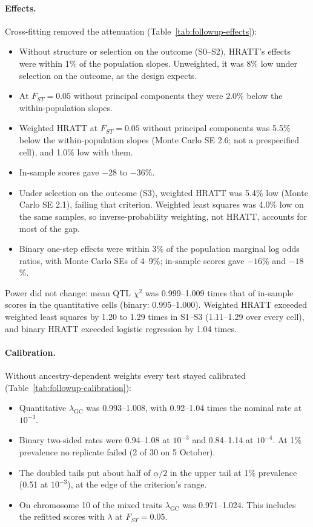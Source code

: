 \documentclass[11pt]{article}
\newcommand{\lgc}{\lambda_{\mathrm{GC}}}
\begin{document}
\paragraph{Effects.}
Cross-fitting removed the attenuation (Table~\ref{tab:followup-effects}):
\begin{itemize}
 \item Without structure or selection on the outcome (S0--S2), HRATT's
  effects were within 1\% of the population slopes. Unweighted, it was 8\%
  low under selection on the outcome, as the design expects.
 \item At $F_{ST}=0.05$ without principal components they were 2.0\% below the
  within-population slopes.
 \item Weighted HRATT at $F_{ST}=0.05$ without principal components was 5.5\%
  below the within-population slopes (Monte Carlo SE 2.6; not a prespecified
  cell), and 1.0\% low with them.
 \item In-sample scores gave $-28$ to $-36$\%.
 \item Under selection on the outcome (S3), weighted HRATT was 5.4\% low
  (Monte Carlo SE 2.1), failing that criterion. Weighted least squares was
  4.0\% low on the same samples, so inverse-probability weighting, not
  HRATT, accounts for most of the gap.
 \item Binary one-step effects were within 3\% of the population marginal log
  odds ratios, with Monte Carlo SEs of 4--9\%; in-sample scores gave
  $-16$\% and $-18$\%.
\end{itemize}

Power did not change: mean QTL $\chi^2$ was 0.999--1.009 times that of
in-sample scores in the quantitative cells (binary: 0.995--1.000). Weighted
HRATT exceeded weighted least squares by 1.20 to 1.29 times in S1--S3
(1.11--1.29 over every cell), and binary HRATT exceeded logistic regression
by 1.04 times.

\paragraph{Calibration.}
Without ancestry-dependent weights every test stayed calibrated
(Table~\ref{tab:followup-calibration}):
\begin{itemize}
 \item Quantitative $\lgc$ was 0.993--1.008, with 0.92--1.04 times the nominal
  rate at $10^{-3}$.
 \item Binary two-sided rates were 0.94--1.08 at $10^{-3}$ and 0.84--1.14 at
  $10^{-4}$. At 1\% prevalence no replicate failed (2 of 30 on 5 October).
 \item The doubled tails put about half of $\alpha/2$ in the upper tail at 1\%
  prevalence (0.51 at $10^{-3}$), at the edge of the criterion's range.
 \item On chromosome 10 of the mixed traits $\lgc$ was 0.971--1.024. This
  includes the refitted scores with $\lambda$ at $F_{ST}=0.05$.
\end{itemize}
\end{document}
